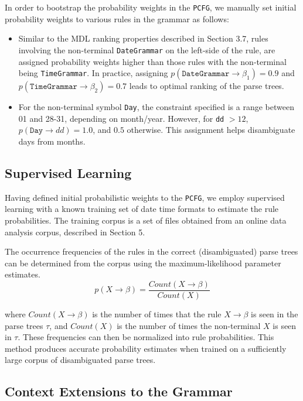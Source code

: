 In order to bootstrap the probability weights in the \texttt{PCFG}, we manually set initial probability weights to various rules in the grammar as follows:
\begin{itemize}
\item Similar to the MDL ranking properties described in Section 3.7, rules involving the non-terminal \texttt{DateGrammar} on the left-side of the rule, are assigned probability weights higher than those rules with the non-terminal being \texttt{TimeGrammar}. In practice, assigning $p(\texttt{DateGrammar} \rightarrow \beta_{1}) = 0.9$ and $p(\texttt{TimeGrammar} \rightarrow \beta_{2}) = 0.7$ leads to optimal ranking of the parse trees.

\item For the non-terminal symbol \texttt{Day}, the constraint specified is a range between 01 and 28-31, depending on month/year. However, for \texttt{dd} $> 12$, $p(\texttt{Day} \rightarrow d d) = 1.0$, and $0.5$ otherwise. This assignment helps disambiguate days from months.


\end{itemize}

\subsection{Supervised Learning}

Having defined initial probabilistic weights to the \texttt{PCFG}, we employ supervised learning with a known training set of date time formats to estimate the rule probabilities.  The training corpus is a set of files obtained from an online data analysis corpus, described in Section 5.

The occurrence frequencies of the rules in the correct
(disambiguated) parse trees can be determined from the corpus using the maximum-likelihood parameter estimates.
\begin{equation}
p(X \rightarrow \beta) = \frac{Count(X \rightarrow \beta)}{Count(X)}
\end{equation}

where $Count(X \rightarrow \beta)$ is the number of times that the rule $X \rightarrow \beta$ is seen in
the parse trees $\tau$, and $Count(X)$ is the number of times the non-terminal $X$ is seen in $\tau$. These frequencies can then be normalized into rule probabilities. This method produces accurate probability estimates when trained on a sufficiently large corpus of disambiguated parse trees. 

\subsection{Context Extensions to the Grammar}


